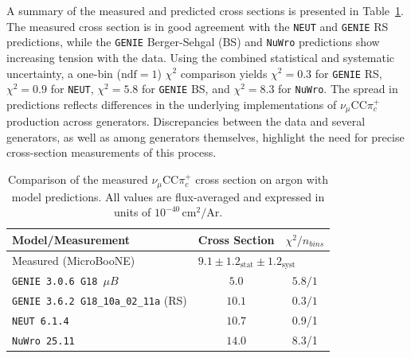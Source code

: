 \documentclass[aps,prl,reprint,superscriptaddress,nofootinbib, showpacs]{revtex4-2}
\begin{document}
A summary of the measured and predicted cross sections is presented in Table~\ref{tab:coh_results}. The measured cross section is in good agreement with the \texttt{NEUT} and \texttt{GENIE} RS predictions, while the \texttt{GENIE} Berger-Sehgal (BS) and \texttt{NuWro} predictions show increasing tension with the data. Using the combined statistical and systematic uncertainty, a one-bin ($\mathrm{ndf}=1$) $\chi^2$ comparison yields $\chi^2 = 0.3$ for \texttt{GENIE} RS, $\chi^2 = 0.9$ for \texttt{NEUT}, $\chi^2 = 5.8$ for \texttt{GENIE} BS, and $\chi^2 = 8.3$ for \texttt{NuWro}. The spread in predictions reflects differences in the underlying implementations of $\nu_\mu$CC$\pi^+_c$ production across generators. Discrepancies between the data and several generators, as well as among generators themselves, highlight the need for precise cross-section measurements of this process.
\begin{table}[h]
\centering
\caption{Comparison of the measured $\nu_\mu$CC$\pi^+_c$ cross section on argon with model predictions. All values are flux-averaged and expressed in units of $10^{-40}\,\text{cm}^2/\text{Ar}$.}
\label{tab:coh_results}
\begin{ruledtabular}
\begin{tabular}{l c c}
Model/Measurement & Cross Section & \textbf{$\chi^2/n_{bins}$}\\
\hline
Measured (MicroBooNE) & \multicolumn{2}{l}{$9.1 \pm 1.2_{\text{stat}} \pm 1.2_\text{syst}$} \\ \hline
\scriptsize \texttt{GENIE 3.0.6 G18 $\mu B$} & $5.0$ & $5.8/1$ \\
\scriptsize \texttt{GENIE 3.6.2 G18\_10a\_02\_11a} (RS) & $10.1$ & $0.3/1$ \\
\scriptsize \texttt{NEUT 6.1.4}  & $10.7$ & 0.9/1\\
\scriptsize \texttt{NuWro 25.11}  & $14.0$ & 8.3/1\\
\end{tabular}
\end{ruledtabular}
\end{table}
\end{document}
